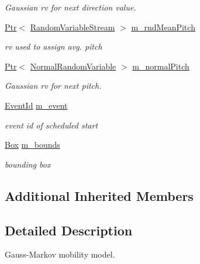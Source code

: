 \begin{DoxyCompactItemize}
\begin{DoxyCompactList}\small\item\em Gaussian rv for next direction value. \end{DoxyCompactList}\item 
\hyperlink{classns3_1_1Ptr}{Ptr}$<$ \hyperlink{classns3_1_1RandomVariableStream}{Random\+Variable\+Stream} $>$ \hyperlink{classns3_1_1GaussMarkovMobilityModel_a9b24b63f6d9177ace0f90e3b76e49a27}{m\+\_\+rnd\+Mean\+Pitch}
\begin{DoxyCompactList}\small\item\em rv used to assign avg. pitch \end{DoxyCompactList}\item 
\hyperlink{classns3_1_1Ptr}{Ptr}$<$ \hyperlink{classns3_1_1NormalRandomVariable}{Normal\+Random\+Variable} $>$ \hyperlink{classns3_1_1GaussMarkovMobilityModel_a1563f603818a75cfd2bd92e0852b3c8e}{m\+\_\+normal\+Pitch}
\begin{DoxyCompactList}\small\item\em Gaussian rv for next pitch. \end{DoxyCompactList}\item 
\hyperlink{classns3_1_1EventId}{Event\+Id} \hyperlink{classns3_1_1GaussMarkovMobilityModel_a697da3a3d27283a7c2c24e562631d9c9}{m\+\_\+event}
\begin{DoxyCompactList}\small\item\em event id of scheduled start \end{DoxyCompactList}\item 
\hyperlink{classns3_1_1Box}{Box} \hyperlink{classns3_1_1GaussMarkovMobilityModel_a067131b9dbb814e9f9f1715cb779fc73}{m\+\_\+bounds}
\begin{DoxyCompactList}\small\item\em bounding box \end{DoxyCompactList}\end{DoxyCompactItemize}
\subsection*{Additional Inherited Members}


\subsection{Detailed Description}
Gauss-\/\+Markov mobility model. 

